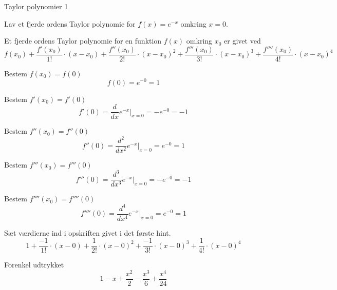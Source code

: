 \documentclass{article}
\begin{document}
\tableofcontents
\newpage

\begin{exercise}{Taylor polynomier 1}

Lav et fjerde ordens Taylor polynomie for $f(x) = e^{-x}$
omkring $x = 0$.


\hint
Et fjerde ordens Taylor polynomie for en funktion $f(x)$
omkring $x_0$ er givet ved
\[
f(x_0) + \frac{f'(x_0)}{1!} \cdot (x - x_0) + \frac{f''(x_0)}{2!} \cdot (x - x_0)^2 + \frac{f'''(x_0)}{3!} \cdot (x - x_0)^3 + \frac{f''''(x_0)}{4!} \cdot (x - x_0)^4
\]

\hint
Bestem $f(x_0) = f(0)$
\[
f(0) = e^{-0} = 1
\]

\hint
Bestem $f'(x_0) = f'(0)$
\[
f'(0) = \frac{d}{dx} e^{-x} \Big|_{x = 0} = -e^{-0} = -1
\]

\hint
Bestem $f''(x_0) = f''(0)$
\[
f''(0) = \frac{d^2}{dx^2} e^{-x} \Big|_{x = 0} = e^{-0} = 1
\]

\hint
Bestem $f'''(x_0) = f'''(0)$
\[
f'''(0) = \frac{d^3}{dx^3} e^{-x} \Big|_{x = 0} = -e^{-0} = -1
\]

\hint
Bestem $f''''(x_0) = f''''(0)$
\[
f''''(0) = \frac{d^4}{dx^4} e^{-x} \Big|_{x = 0} = e^{-0} = 1
\]

\hint
Sæt værdierne ind i opskriften givet i det første hint.
\[
1 + \frac{-1}{1!} \cdot (x - 0) + \frac{1}{2!} \cdot (x - 0)^2 + \frac{-1}{3!} \cdot (x - 0)^3 + \frac{1}{4!} \cdot (x - 0)^4
\]

\hint
Forenkel udtrykket
\[
1 - x + \frac{x^2}{2} - \frac{x^3}{6} + \frac{x^4}{24}
\]

\end{exercise}
\end{document}
